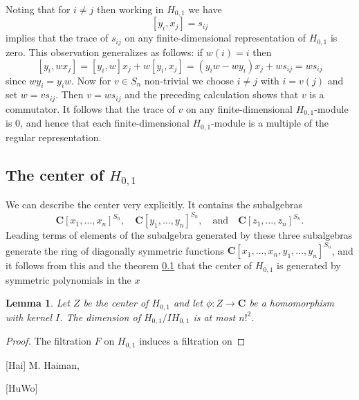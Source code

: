 \documentclass[12pt, reqno]{amsart}
\numberwithin{equation}{section}
\theoremstyle{definition}
\theoremstyle{plain}
\newtheorem{lemma}[theorem]{Lemma}
\newcommand{\CC}{\mathbf{C}}
\begin{document}
Noting that for $i \neq j$ then working in $H_{0,1}$ we have
$$[y_i,x_j]=s_{ij}$$ implies that the trace of $s_{ij}$ on any finite-dimensional representation of $H_{0,1}$ is zero. This observation generalizes as follows: if $w(i)=i$ then $$[y_i,w x_j]=[y_i,w]x_j+w[y_i,x_j]=(y_i w-wy_i)x_j+w s_{ij}=w s_{ij}$$ since $wy_i=y_i w$. Now for $v \in S_n$ non-trivial we choose $i \neq j$ with $i=v(j)$ and set $w=v s_{ij}$. Then $v=w s_{ij}$ and the preceding calculation shows that $v$ is a commutator. It follows that the trace of $v$ on any finite-dimensional $H_{0,1}$-module is $0$, and hence that each finite-dimensional $H_{0,1}$-module is a multiple of the regular representation.

\subsection{The center of $H_{0,1}$} We can describe the center very explicitly. It contains the subalgebras $$\CC[x_1,\dots,x_n]^{S_n}, \quad \CC[y_1,\dots,y_n]^{S_n}, \quad \text{and} \quad \CC[z_1,\dots,z_n]^{S_n}.$$ Leading terms of elements of the subalgebra generated by these three subalgebras generate the ring of diagonally symmetric functions $\CC[x_1,\dots,x_n,y_1,\dots,y_n]^{S_n}$, and it follows from this and the theorem \ref{} that the center of $H_{0,1}$ is generated by symmetric polynomials in the $x$

\begin{lemma}
Let $Z$ be the center of $H_{0,1}$ and let $\phi:Z \rightarrow \CC$ be a homomorphism with kernel $I$. The dimension of $H_{0,1}/I H_{0,1}$ is at most $n!^2$.\end{lemma}
\begin{proof}
The filtration $F$ on $H_{0,1}$ induces a filtration on 	
\end{proof}


%
\def\cprime{$'$} \def\cprime{$'$}
\begin{thebibliography}{GGOR}

[Hai]
 M. Haiman, \emph{}
 
 [HuWo] 
 
 \end{thebibliography}
\end{document}
